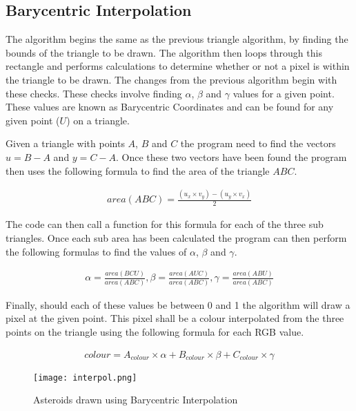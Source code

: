 \documentclass[
	a4paper, %
	10pt, %
]{CSUniSchoolLabReport}
\begin{document}
\subsection{Barycentric Interpolation}
\begin{flushleft}
	The algorithm begins the same as the previous triangle algorithm, by 
	finding the bounds of the triangle to be drawn. The algorithm then loops through
	this rectangle and performs calculations to determine whether or not a pixel is within
	the triangle to be drawn. The changes from the previous algorithm begin with these checks.
	These checks involve finding \(\alpha\), \(\beta\) and \(\gamma\) values for a given point.
	These values are known as Barycentric Coordinates and can be found for any given point (\(U\))
	on a triangle.
\end{flushleft}
\begin{flushleft}
	Given a triangle with points \(A\), \(B\) and \(C\) the program need to find the vectors \(u = B-A\) and \(y = C-A\).
	Once these two vectors have been found the program then uses the following formula to find the area of the triangle \(ABC\).
\end{flushleft}
\begin{align*}
	area(ABC) = \frac{(u_{x} \times v_{y}) - (u_{y} \times v_{x})}{2}
\end{align*}
\begin{flushleft}
	The code can then call a function for this formula for each of the three sub triangles. Once each sub area has 
	been calculated the program can then perform the following formulas to find the values of \(\alpha\), \(\beta\) and \(\gamma\).
\end{flushleft}
\begin{align*}
	\alpha = \frac{area(BCU)}{area(ABC)}, \beta = \frac{area(AUC)}{area(ABC)}, \gamma = \frac{area(ABU)}{area(ABC)}
\end{align*}
\pagebreak
\begin{flushleft}
	Finally, should each of these values be between 0 and 1 the algorithm will draw a pixel at the given point.
	This pixel shall be a colour interpolated from the three points on the triangle using the following formula 
	for each RGB value.
\end{flushleft}
\begin{align*}
	colour = A_{colour} \times \alpha + B_{colour} \times \beta + C_{colour} \times \gamma
\end{align*}
\begin{figure}[H]
	\centering
	\texttt{[image: interpol.png]}
	\caption{Asteroids drawn using Barycentric Interpolation}
\end{figure}
\end{document}
